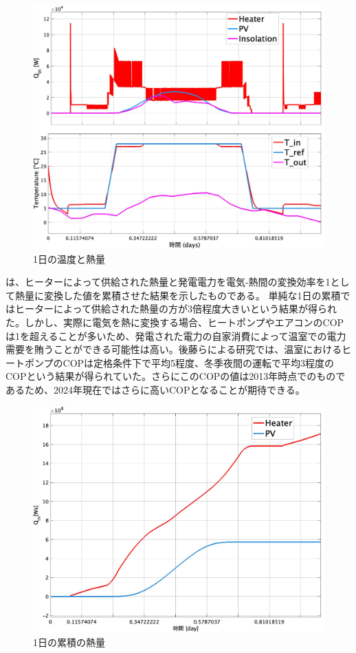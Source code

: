 \documentclass[uplatex,dvipdfmx,nomag,a4paper,oneside,onecolumn,12pt]{bxjsreport} %
\begin{document}
\begin{figure}[ht]
    \centering
    \includegraphics[width=0.7\linewidth]{fig/Qin-Temp.jpg}
    \caption{1日の温度と熱量}
    \label{fig:QinTemp}
\end{figure}


は、ヒーターによって供給された熱量と発電電力を電気-熱間の変換効率を1として熱量に変換した値を累積させた結果を示したものである。
単純な1日の累積ではヒーターによって供給された熱量の方が3倍程度大きいという結果が得られた。しかし、実際に電気を熱に変換する場合、ヒートポンプやエアコンのCOPは1を超えることが多いため、発電された電力の自家消費によって温室での電力需要を賄うことができる可能性は高い。後藤らによる研究\cite{Cop2013}では、温室におけるヒートポンプのCOPは定格条件下で平均5程度、冬季夜間の運転で平均3程度のCOPという結果が得られていた。さらにこのCOPの値は2013年時点でのものであるため、2024年現在ではさらに高いCOPとなることが期待できる。

\begin{figure}[ht]
    \centering
    \includegraphics[width=0.8\linewidth]{fig/Qintotal.jpg}
    \caption{1日の累積の熱量}
    \label{fig:QinTotal}
\end{figure}
\end{document}

